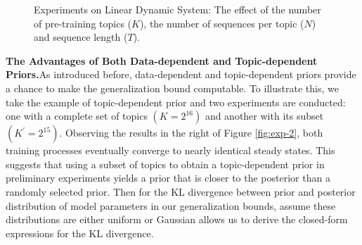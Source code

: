 \begin{figure*}
	\centering
	\quad
	\quad
	\caption{Experiments on Linear Dynamic System: The effect of the number of pre-training topics ($K$), the number of sequences per topic ($N$) and sequence length ($T$).}
	\label{fig:exp1}
\end{figure*} 


\textbf{The Advantages of Both Data-dependent and Topic-dependent Priors.}\quad As introduced before, data-dependent and topic-dependent priors provide a chance to make the generalization bound computable. To illustrate this, we take the example of topic-dependent prior and two experiments are conducted: one with a complete set of topics $(K=2^{16})$ and another with its subset $(K^\prime=2^{15})$. Observing the results in the right of Figure \ref{fig:exp-2}, both training processes eventually converge to nearly identical steady states. This suggests that using a subset of topics to obtain a topic-dependent prior in preliminary experiments yields a prior that is closer to the posterior than a randomly selected prior. Then for the KL divergence between prior and posterior distribution of model parameters in our generalization bounds, assume these distributions are either uniform or Gaussian allows us to derive the closed-form expressions for the KL divergence.

